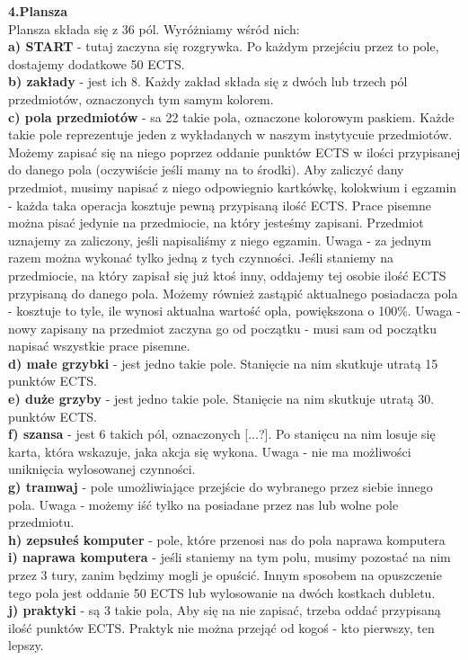 \documentclass[a4paper]{article}
\begin{document}
\noindent \textbf{4.Plansza}\\
Plansza składa się z 36 pól. Wyróżniamy wśród nich:\\
\noindent \textbf{a) START} - tutaj zaczyna się rozgrywka. Po każdym przejściu przez to pole, dostajemy dodatkowe 50 ECTS.\\
\noindent \textbf{b) zakłady} - jest ich 8. Każdy zakład składa się z dwóch lub trzech pól przedmiotów, oznaczonych tym samym kolorem.\\
\noindent \textbf{c) pola przedmiotów} - sa 22 takie pola, oznaczone kolorowym paskiem. Każde takie pole reprezentuje jeden z wykładanych w naszym instytycuie przedmiotów. Możemy zapisać się na niego poprzez oddanie punktów ECTS w ilości przypisanej do danego pola (oczywiście jeśli mamy na to środki). Aby zaliczyć dany przedmiot, musimy napisać z niego odpowiegnio kartkówkę, kolokwium i egzamin - każda taka operacja kosztuje pewną przypisaną ilość ECTS. Prace pisemne można pisać jedynie na przedmiocie, na który jesteśmy zapisani. Przedmiot uznajemy za zaliczony, jeśli napisaliśmy z niego egzamin. Uwaga - za jednym razem można wykonać tylko jedną z tych czynności. Jeśli staniemy na przedmiocie, na który zapisał się już ktoś inny, oddajemy tej osobie ilość ECTS przypisaną do danego pola. Możemy również zastąpić aktualnego posiadacza pola - kosztuje to tyle, ile wynosi aktualna wartość opla, powiększona o 100\%. Uwaga - nowy zapisany na przedmiot zaczyna go od początku - musi sam od początku napisać wszystkie prace pisemne.\\ 
\noindent \textbf{d) małe grzybki} - jest jedno takie pole. Stanięcie na nim skutkuje utratą 15 punktów ECTS.\\
\noindent \textbf{e) duże grzyby} - jest jedno takie pole. Stanięcie na nim skutkuje utratą 30. punktów ECTS.\\
\noindent \textbf{f) szansa} - jest 6 takich pól, oznaczonych [...?]. Po stanięcu na nim losuje się karta, która wskazuje, jaka akcja się wykona. Uwaga - nie ma możliwości uniknięcia wylosowanej czynności.\\
\noindent \textbf{g) tramwaj} - pole umożliwiające przejście do wybranego przez siebie innego pola. Uwaga - możemy iść tylko na posiadane przez nas lub wolne pole przedmiotu. \\
\noindent \textbf{h) zepsułeś komputer} - pole, które przenosi nas do pola naprawa komputera\\
\noindent \textbf{i) naprawa komputera} - jeśli staniemy na tym polu, musimy pozostać na nim przez 3 tury, zanim będzimy mogli je opuścić. Innym sposobem na opuszczenie tego pola jest oddanie 50 ECTS lub wylosowanie na dwóch kostkach dubletu.\\
\noindent \textbf{j) praktyki} - są 3 takie pola, Aby się na nie zapisać, trzeba oddać przypisaną ilość punktów ECTS. Praktyk nie można przejąć od kogoś - kto pierwszy, ten lepszy.\\ 
\vspace{10pt}
\end{document}
